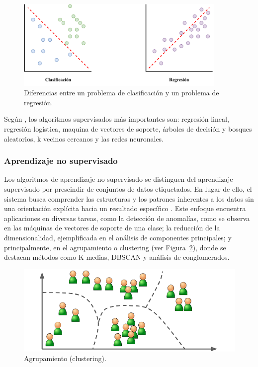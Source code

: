 \begin{figure}[H]
    \begin{center}
        \includegraphics[width=0.9\textwidth]{Images/supervised.pdf}
    \end{center}
    \caption{Diferencias entre un problema de clasificación y un problema de regresión.}
    \label{fig:supervised}
\end{figure}

Según , los algoritmos supervisados más importantes son: regresión lineal, regresión logística, maquina de vectores de soporte, árboles de decisión y bosques aleatorios, k vecinos cercanos y las redes neuronales.

\subsubsection{Aprendizaje no supervisado}

Los algoritmos de aprendizaje no supervisado se distinguen del aprendizaje supervisado por prescindir de conjuntos de datos etiquetados. En lugar de ello, el sistema busca comprender las estructuras y los patrones inherentes a los datos sin una orientación explícita hacia un resultado específico  \cite{geron2019hands}. Este enfoque encuentra aplicaciones en diversas tareas, como la detección de anomalías, como se observa en las máquinas de vectores de soporte de una clase; la reducción de la dimensionalidad, ejemplificada en el análisis de componentes principales; y principalmente, en el agrupamiento o clustering (ver Figura~\ref{fig:clustering}), donde se destacan métodos como K-medias, DBSCAN y análisis de conglomerados.

\begin{figure}[H]
    \begin{center}
        \includegraphics[width=1\textwidth]{Images/clustering.png}
    \end{center}
    \caption{Agrupamiento (clustering).}
    \label{fig:clustering}
\end{figure}

